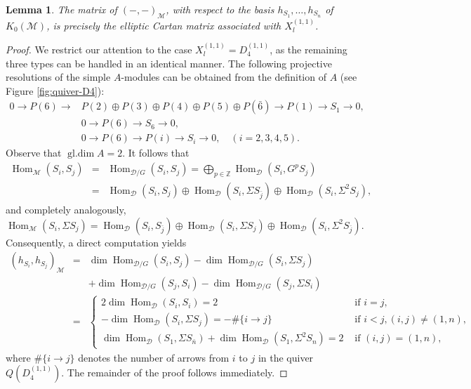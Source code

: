 \documentclass[12pt,reqno]{amsart}
\numberwithin{equation}{section}
\newcommand{\gldim}{\operatorname{gl.dim}\nolimits}
\newcommand{\Hom}{\operatorname{Hom}\nolimits}
\renewcommand{\dim}{\operatorname{dim}\nolimits}
\newcommand{\go}{{K_0}}
\newtheorem{lemma}[theorem]{Lemma}
\begin{document}
	
	\begin{lemma}\label{lem:Euler-form-M}
		The matrix of $(-,-)_{\mathcal{M}}$, with respect to the basis $h_{{S}_{1}},\ldots,h_{{S}_{n}}$ of $\go(\mathcal{M})$, is precisely the elliptic Cartan matrix associated with $X_l^{(1,1)}$.
	\end{lemma}
	\begin{proof}
		We restrict our attention to the case $X_l^{(1,1)} = D_4^{(1,1)}$, as the remaining three types can be handled in an identical manner.  The following projective resolutions of the simple $A$-modules can be obtained from the definition of $A$ (see Figure \ref{fig:quiver-D4}):
		\begin{align}
			0\rightarrow P(6) \rightarrow & P(2)\oplus P(3)\oplus P(4)\oplus P(5)\oplus P(\bar 6) \rightarrow P(1) \rightarrow S_1\to0,\label{eq:pro-res-simple 1}\\
			&0\rightarrow  P(6) \rightarrow S_6\to0,\label{eq:pro-res-simple 6}\\
			&0\rightarrow P(6) \rightarrow P(i) \rightarrow S_i\rightarrow 0, \quad (i=2,3,4,5)\label{eq:pro-res-simple i}.
		\end{align}
		Observe that $\gldim A=2$. It follows that
		\begin{eqnarray*}
			\Hom_{\mathcal{M}}(S_i,S_j)
			&=& \Hom_{\mathcal{D}/G}(S_i,S_j)=\bigoplus_{p\in \mathbb{Z}}\Hom_{\mathcal{D}}(S_i,G^pS_j)\\
			&=&\Hom_{\mathcal{D}}(S_i,S_j)\oplus \Hom_{\mathcal{D}}(S_i,\Sigma S_{\bar{j}})\oplus \Hom_{\mathcal{D}}(S_i,\Sigma^2 S_j),
		\end{eqnarray*}
		and completely analogously,
		\[\Hom_{\mathcal{M}}(S_i,\Sigma S_j)
		=\Hom_{\mathcal{D}}(S_i,S_{\bar{j}})\oplus \Hom_{\mathcal{D}}(S_i,\Sigma S_j)\oplus \Hom_{\mathcal{D}}(S_i,\Sigma^2S_{\bar j}).\]
		Consequently, a direct computation yields
		\begin{eqnarray*}
			(h_{S_i},h_{S_j})_{\mathcal{M}}
			&=& \dim \Hom_{\mathcal{D}/G}(S_i,S_j)-\dim \Hom_{\mathcal{D}/G}(S_i,\Sigma S_j)\\
			&& +\dim \Hom_{\mathcal{D}/G}(S_j,S_i)-\dim \Hom_{\mathcal{D}/G}(S_j,\Sigma S_i)\\
			&=& \begin{cases}
				2\dim \Hom_{\mathcal{D}}(S_i,S_i)=2 & \text{ if }i=j, \\
				-\dim \Hom_{\mathcal{D}}(S_i,\Sigma S_j)=-\#\{i\rightarrow j\} & \text{ if }i<j,(i,j)\ne (1,n),\\
				\dim \Hom_{\mathcal{D}}(S_1,\Sigma S_{\bar n})+\dim\Hom_{\mathcal{D}}(S_1,\Sigma^2 S_n)=2 & \text{ if }(i,j)=(1,n),
			\end{cases}
		\end{eqnarray*}
		where $\#\{i\rightarrow j\}$ denotes the number of arrows from $i$ to $j$ in the quiver $Q(D_4^{(1,1)})$. The remainder of the proof follows immediately.
	\end{proof}
	
\end{document}
